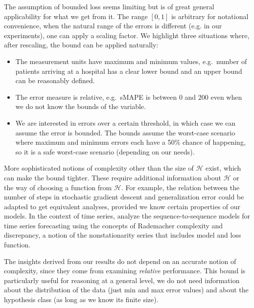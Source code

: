 \documentclass[a4paper]{article}
\theoremstyle{custom}
\begin{document}
The assumption of bounded loss seems limiting but is of great general applicability for what we get from it.
The range $[0,1]$ is arbitrary for notational convenience, when the natural range of the errors is different (e.g. in our experiments), one can apply a scaling factor.
We highlight three situations where, after rescaling, the bound can be applied naturally:
\begin{itemize}
  \item The measurement units have maximum and minimum values, e.g.\ number of patients arriving at a hospital has a clear lower bound and an upper bound can be reasonably defined.
  \item The error measure is relative, e.g.\ sMAPE is between 0 and 200 even when we do not know the bounds of the variable.
  \item We are interested in errors over a certain threshold, in which case we can assume the error is bounded. The bounds assume the worst-case scenario where maximum and minimum errors each have a 50\% chance of happening, so it is a safe worst-case scenario (depending on our needs).
\end{itemize}

More sophisticated notions of complexity other than the size of $\mathcal{H}$ exist, which can make the bound tighter. These require additional information about $\mathcal{H}$ or the way of choosing a function from $\mathcal{H}$. For example, the relation between the number of steps in stochastic gradient descent and generalization error \cite{hardt2016train} could be adapted to get equivalent analyses, provided we know certain properties of our models. In the context of time series, \cite{mariet2019foundations} analyze the sequence-to-sequence models for time series forecasting using the concepts of Rademacher complexity and discrepancy, a notion of the nonstationarity series that includes model and loss function.

The insights derived from our results do not depend on an accurate notion of complexity, since they come from examining \textit{relative} performance. This bound is particularly useful for reasoning at a general level, we do not need information about the distribution of the data (just min and max error values) and about the hypothesis class (as long as we know its finite size).
\end{document}
